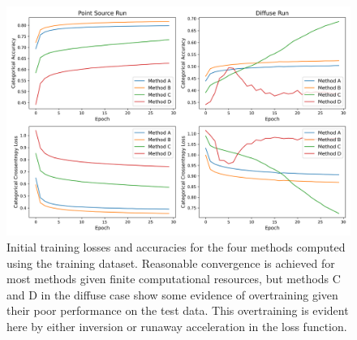  \begin{figure}[t]
  \centering
  \includegraphics[width=\textwidth]{figures/trainlog.png}
  \caption{Initial training losses and accuracies for the four methods computed using the training dataset. Reasonable convergence is achieved for most methods given finite computational resources, but methods C and D in the diffuse case show some evidence of overtraining given their poor performance on the test data. This overtraining is evident here by either inversion or runaway acceleration in the loss function.
  }
  \label{fig:trainlog}
\end{figure}
